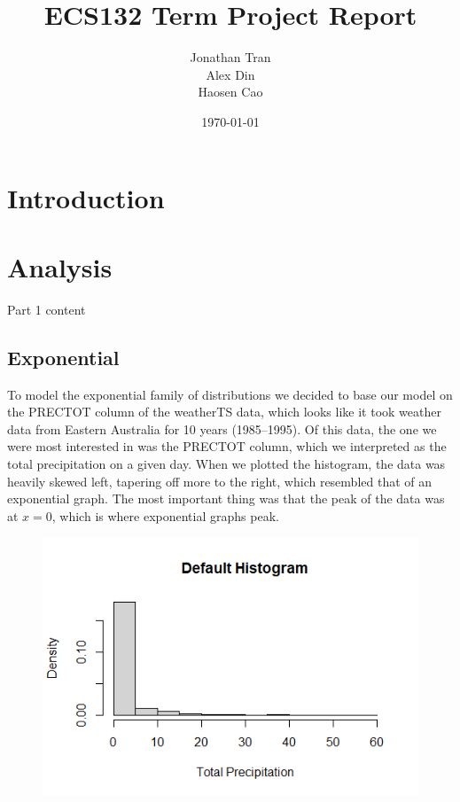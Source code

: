 \documentclass[12pt, a4paper, oneside]{report}
\title{ECS132 Term Project Report}
\author{Jonathan Tran\\Alex Din\\Haosen Cao}
\date{\today}
\begin{document}
\maketitle
\tableofcontents
\newpage

\chapter{Introduction}

\newpage





\chapter{Analysis}
Part 1 content
\newpage




\section{Exponential}
To model the exponential family of distributions we decided to base our model on the PRECTOT column of the weatherTS data, which looks like it took weather data from Eastern Australia for 10 years (1985--1995).
Of this data, the one we were most interested in was the PRECTOT column, which we interpreted as the total precipitation on a given day.
When we plotted the histogram, the data was heavily skewed left, tapering off more to the right, which resembled that of an exponential graph.
The most important thing was that the peak of the data was at \(x = 0\), which is where exponential graphs peak.

\begin{figure}[h]
  \centering
  \includegraphics[width=0.8\linewidth]{expHistDefault.png}
\end{figure}
\end{document}
